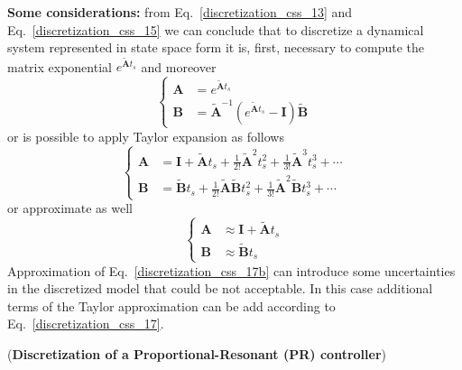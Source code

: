 \documentclass[12pt,a4paper,oneside]{book}
\begin{document}
\begin{onehalfspace}
\noindent\textbf{Some considerations:} from Eq.~\eqref{discretization_css_13} 
and Eq.~\eqref{discretization_css_15} we can conclude that to discretize a 
dynamical system represented in state space form it is, first, necessary to compute the matrix exponential $e^{\tilde{\mathbf{A}}t_s}$ and moreover
\begin{equation}\label{discretization_css_16}
	\left\lbrace \begin{aligned}
		\mathbf{A} &= e^{\tilde{\mathbf{A}}t_s} \\[6pt]
		\mathbf{B} &= \tilde{\mathbf{A}}^{-1}\left( e^{\tilde{\mathbf{A}}t_s} -\mathbf{I}\right) \tilde{\mathbf{B}}
	\end{aligned}\right. 
\end{equation}
or is possible to apply Taylor expansion as follows
\begin{equation}\label{discretization_css_17}
	\left\lbrace \begin{aligned}
		\mathbf{A} &= \mathbf{I} + {\tilde{\mathbf{A}}t_s} + 
		{\frac{1}{2!}\tilde{\mathbf{A}}^2t_s^2} + 
		{\frac{1}{3!}\tilde{\mathbf{A}}^3t_s^3} +\cdots 
		\\[6pt]
		\mathbf{B} &= \tilde{\mathbf{B}} t_s + 
		{\frac{1}{2!}\tilde{\mathbf{A}}\tilde{\mathbf{B}}t_s^2} + 
		{\frac{1}{3!}\tilde{\mathbf{A}}^2\tilde{\mathbf{B}}t_s^3} + \cdots 
	\end{aligned}\right. 
\end{equation}
or approximate as well
\begin{equation}\label{discretization_css_17b}
	\left\lbrace \begin{aligned}
		\mathbf{A} &\approx \mathbf{I} + {\tilde{\mathbf{A}}t_s} 
		\\[6pt]
		\mathbf{B} &\approx \tilde{\mathbf{B}} t_s 
	\end{aligned}\right. 
\end{equation}
Approximation of Eq.~\eqref{discretization_css_17b} can introduce some 
uncertainties in the discretized model that could be not acceptable. In this case 
additional terms of the Taylor approximation can be add according to 
Eq.~\eqref{discretization_css_17}. 

\vspace{5mm}
\begin{example}(\textbf{Discretization of a Proportional-Resonant (PR) 
controller})


\end{example}
\end{onehalfspace}
\end{document}

